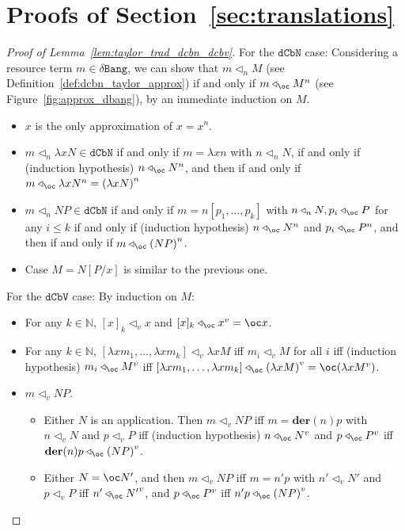 \documentclass[10pt,a4paper]{article}
\newcommand{\<}{\langle}
\renewcommand{\>}{\rangle}
\newcommand{\der}[1]{\ensuremath{\mathbf{der}(#1)}}
\newcommand{\dcbn}{\ensuremath{\mathtt{dCbN}}}
\newcommand{\dcbv}{\ensuremath{\mathtt{dCbV}}}
\newcommand{\dbangres}{\ensuremath{\mathtt{\delta Bang}}}
\newcommand{\tradv}[1]{\ensuremath{{#1}^v}}
\newcommand{\tradn}[1]{\ensuremath{{#1}^n}}
\newcommand{\app}{\triangleleft_\oc} %
\newcommand{\appv}{\triangleleft_v} %
\newcommand{\appn}{\triangleleft_n} %
\begin{document}
\section{Proofs of Section~\ref{sec:translations}}
\label{appendix:translation}


\begin{proof}[Proof of Lemma~\ref{lem:taylor_trad_dcbn_dcbv}]
	For the $\dcbn$ case:
	Considering a resource term $m\in\dbangres$, we can show that $m\appn M$ (see
	Definition~\ref{def:dcbn_taylor_approx}) if and only if $m\app \tradn
	M$ (see Figure~\ref{fig:approx_dbang}), by an immediate induction on $M$.
	\begin{itemize}
		\item $x$ is the only approximation of $x=\tradn x$.
		\item $m\appn\lambda xN \in \dcbn$ if and only if $m=\lambda xn$ with
			$n\appn N$, if and only if (induction hypothesis) $n\app \tradn N$,
			and then if and only if $m\app \lambda x\tradn N=\tradn{(\lambda xN)}$
		\item $m\appn NP\in\dcbn$ if and only if $m=n[p_1,\dots ,p_k]$ with
			$n\appn N, p_i\app P$ for any $i\leq k$ if and only if
			(induction hypothesis) $n\app \tradn N$ and
			$p_i\app\tradn P$, and then if and only if $m\app
			\tradn{(NP)}$.
		\item Case $M= N[P/x]$ is similar to the previous one. \qedhere
	\end{itemize}

	For the $\dcbv$ case:
		By induction on $M$:
	\begin{itemize}
		\item For any $k\in\mathbb N$, $[x]_k\appv x$ and $[x]_k\app
			\tradv x = \oc x$.
		\item For any $k\in\mathbb N$, $[\lambda xm_1,\dots ,\lambda xm_k]
			\appv \lambda xM$ iff $m_i\appv M$ for all $i$ iff
			(induction hypothesis) $m_i\app \tradv M$ iff $[\lambda
			xm_1,\dots ,\lambda xm_k]\app\tradv{(\lambda xM)}=\oc(\lambda
			x\tradv M)$.
		\item $m\appv NP$.
			\begin{itemize}
				\item Either $N$ is an application. Then
					$m\appv NP$ iff $m=\der np$ with $n\appv N$ and $p\appv
					P$ iff (induction hypothesis) $n\app \tradv N$ and
					$p\app\tradv P$ iff $\der np\app\tradv{(NP)}$.
				\item Either $N=\oc N'$, and then $m\appv NP$
					iff $m= n'p$ with $n'\appv N'$ and
					$p\appv P$ iff $n'\app\tradv{N'}$, and
					$p\app\tradv P$ iff
					$n'p\app\tradv{(NP)}$. \qedhere
			\end{itemize}
	\end{itemize}
\end{proof}
\end{document}
